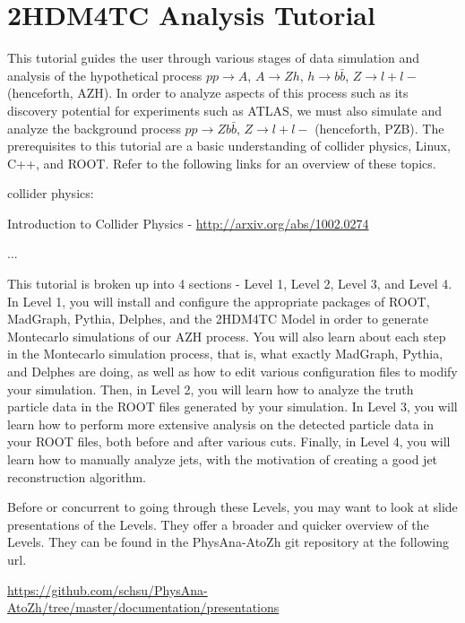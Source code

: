 \documentclass{article}
\begin{document}
\section*{2HDM4TC Analysis Tutorial}

This tutorial guides the user through various stages of data simulation and analysis of the hypothetical process 
$p p \rightarrow{} A$, $A \rightarrow{} Z h$, $h \rightarrow{} b \bar{b}$, $Z \rightarrow{} l+ l-$ (henceforth, AZH).
In order to analyze aspects of this process such as its discovery potential for experiments such as ATLAS, we must also simulate and analyze the background process
$p p \rightarrow{} Z b \bar{b}$, $Z \rightarrow{} l+ l-$ (henceforth, PZB).
The prerequisites to this tutorial are a basic understanding of collider physics, Linux, C++, and ROOT. Refer to the following links for an overview of these topics.

\bigskip

collider physics:

Introduction to Collider Physics - \url{http://arxiv.org/abs/1002.0274}

...

\bigskip

This tutorial is broken up into 4 sections - Level 1, Level 2, Level 3, and Level 4.
In Level 1, you will install and configure the appropriate packages of ROOT, MadGraph,
Pythia, Delphes, and the 2HDM4TC Model in order to generate Montecarlo simulations of
our AZH process. You will also learn about each step in the Montecarlo simulation process,
that is, what exactly MadGraph, Pythia, and Delphes are doing, as well as how to edit
various configuration files to modify your simulation. Then, in Level 2, you will learn
how to analyze the truth particle data in the ROOT files generated by your simulation.
In Level 3, you will learn how to perform more extensive analysis on the detected particle
data in your ROOT files, both before and after various cuts. Finally, in Level 4, you will
learn how to manually analyze jets, with the motivation of creating a good jet reconstruction algorithm.

\bigskip

Before or concurrent to going through these Levels, you may want to look at slide presentations
of the Levels. They offer a broader and quicker overview of the Levels. They can be found in the
PhysAna-AtoZh git repository at the following url.

\bigskip

\url{https://github.com/schsu/PhysAna-AtoZh/tree/master/documentation/presentations}
\end{document}
